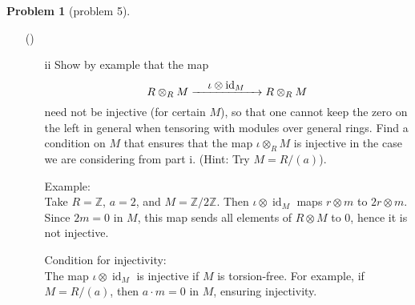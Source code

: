 \documentclass[12pt]{article}
\theoremstyle{definition}
\newtheorem{problem}{Problem}
\newcounter{subq}[problem]
\newenvironment{subproblem}
{\refstepcounter{subq} \begin{itemize} \item[(\alph{subq})]}
{\end{itemize} \medskip}
\DeclareMathOperator{\id}{id}
\begin{document}
\begin{problem}[problem 5]
\begin{subproblem}
\begin{enumerate}
            \item[ii] Show by example that the map
            \[
                R \otimes_R M \xrightarrow{\makebox[2cm]{$\iota \otimes \id_M$}} R \otimes_R M
            \]
            need not be injective (for certain $M$), so that one cannot keep the zero on the left in general when tensoring with modules over
            general rings. Find a condition on $M$ that ensures that the map $\iota \otimes_R M$ is injective in the case we are considering 
            from part i. (Hint: Try $M = R/(a)$).

            \begin{solution}
                Example:\\
                Take \( R = \mathbb{Z} \), \( a = 2 \), and \( M = \mathbb{Z}/2\mathbb{Z} \). Then \( \iota \otimes \id_M \) maps \( r \otimes m \) to \( 2r \otimes m \). Since \( 2m = 0 \) in \( M \), this map sends all elements of \( R \otimes M \) to 0, hence it is not injective.

                Condition for injectivity:\\
                The map \( \iota \otimes \id_M \) is injective if \( M \) is torsion-free. For example, if \( M = R/(a) \), then \( a \cdot m = 0 \) in \( M \), ensuring injectivity.
            
            \end{solution}
        \end{enumerate}
    \end{subproblem}
\end{problem}
\end{document}
